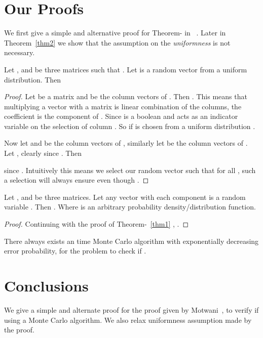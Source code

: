 \documentclass[runningheads]{llncs}
\begin{document}
\section{Our Proofs}
We first give a simple and alternative proof for Theorem- in ~\cite{motwani1995}. Later in Theorem~\ref{thm2}
we show that the assumption on the {\em uniformness} is not necessary. 
\begin{theorem}
\label{thm1}
Let , and  be three  matrices such that . Let 
is a random vector from a uniform distribution. Then 
\end{theorem}
\begin{proof}
Let  be a  matrix and  be the column vectors of .
Then . This means that multiplying a vector with a matrix is linear
combination of the columns, the coefficient  is the  component of . Since 
is a boolean and  acts as an indicator variable on the selection of column . So if 
is chosen from a uniform distribution . 

Now let  and  be the column vectors of , similarly 
let  be the column vectors of . Let
, clearly  since . Then

since .  Intuitively this means we select our random vector  such that
 for all , such a selection will always ensure  even though
.
\end{proof}

\begin{theorem}
\label{thm2}
Let , and  be three  matrices. Let  any vector
with each component  is a  random variable . Then 
. Where  is an arbitrary probability density/distribution
function.
\end{theorem}
\begin{proof}
Continuing with the proof of Theorem-~\ref{thm1} , .
\end{proof}

\begin{corollary}
There always exists an  time Monte Carlo algorithm with exponentially decreasing error probability, for the
problem to check if . 
\end{corollary}

\section{Conclusions}
We give a simple and alternate proof for the proof given by Motwani~\cite{motwani1995}, to verify if 
using a Monte Carlo algorithm. We also relax uniformness assumption made by the proof.



\end{document}
